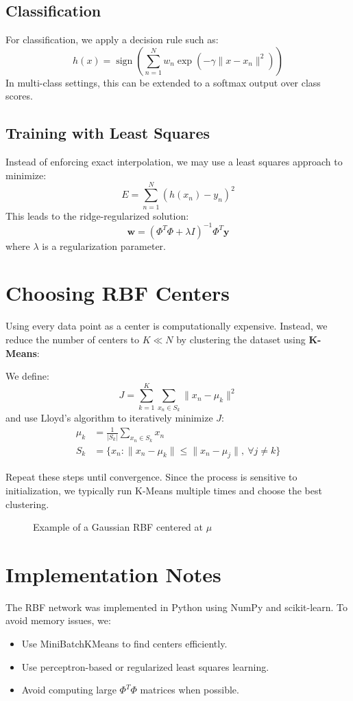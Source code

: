 \documentclass[twocolumn]{article} %
\begin{document}
\subsection{Classification}
For classification, we apply a decision rule such as:
\[
h(x) = \operatorname{sign}\left(\sum_{n=1}^N w_n\exp(-\gamma\|x - x_n\|^2)\right)
\]
In multi-class settings, this can be extended to a softmax output over class scores.

\subsection{Training with Least Squares}
Instead of enforcing exact interpolation, we may use a least squares approach to minimize:
\[
E = \sum_{n=1}^N (h(x_n) - y_n)^2
\]
This leads to the ridge-regularized solution:
\[
\mathbf{w} = (\Phi^T\Phi + \lambda I)^{-1}\Phi^T \mathbf{y}
\]
where $\lambda$ is a regularization parameter.

\section{Choosing RBF Centers}
Using every data point as a center is computationally expensive. Instead, we reduce the number of centers to $K \ll N$ by clustering the dataset using \textbf{K-Means}:

We define:
\[
J = \sum_{k=1}^K \sum_{x_n \in S_k} \| x_n - \mu_k \|^2
\]
and use Lloyd's algorithm to iteratively minimize $J$:
\begin{align*}
\mu_k &= \frac{1}{|S_k|}\sum_{x_n \in S_k} x_n \\
S_k &= \{ x_n : \|x_n - \mu_k\| \leq \|x_n - \mu_j\|,\ \forall j \neq k \}
\end{align*}

Repeat these steps until convergence. Since the process is sensitive to initialization, we typically run K-Means multiple times and choose the best clustering.

\begin{figure}[h!]
    \centering
    
    \caption{Example of a Gaussian RBF centered at $\mu$}
    \label{fig:gaussian_rbf}
\end{figure} 

\section{Implementation Notes}
The RBF network was implemented in Python using NumPy and scikit-learn. To avoid memory issues, we:
\begin{itemize}
    \item Use MiniBatchKMeans to find centers efficiently.
    \item Use perceptron-based or regularized least squares learning.
    \item Avoid computing large $\Phi^T\Phi$ matrices when possible.
\end{itemize}
\end{document}
